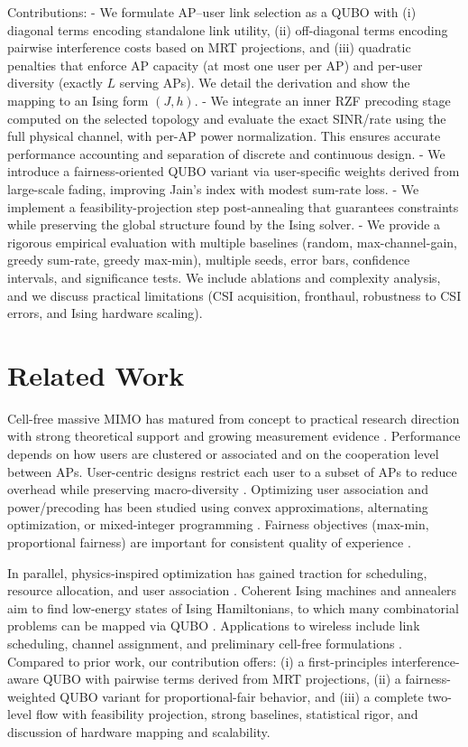 {Contributions:
- We formulate AP–user link selection as a QUBO with (i) diagonal terms encoding standalone link utility, (ii) off-diagonal terms encoding pairwise interference costs based on MRT projections, and (iii) quadratic penalties that enforce AP capacity (at most one user per AP) and per-user diversity (exactly $L$ serving APs). We detail the derivation and show the mapping to an Ising form $(J,h)$.
- We integrate an inner RZF precoding stage computed on the selected topology and evaluate the exact SINR/rate using the full physical channel, with per-AP power normalization. This ensures accurate performance accounting and separation of discrete and continuous design.
- We introduce a fairness-oriented QUBO variant via user-specific weights derived from large-scale fading, improving Jain’s index with modest sum-rate loss. 
- We implement a feasibility-projection step post-annealing that guarantees constraints while preserving the global structure found by the Ising solver.
- We provide a rigorous empirical evaluation with multiple baselines (random, max-channel-gain, greedy sum-rate, greedy max-min), multiple seeds, error bars, confidence intervals, and significance tests. We include ablations and complexity analysis, and we discuss practical limitations (CSI acquisition, fronthaul, robustness to CSI errors, and Ising hardware scaling).

\section{Related Work}
Cell-free massive MIMO has matured from concept to practical research direction with strong theoretical support and growing measurement evidence \cite{ngo2017cell,demir2021foundations,bjornson2019massive}. Performance depends on how users are clustered or associated and on the cooperation level between APs. User-centric designs restrict each user to a subset of APs to reduce overhead while preserving macro-diversity \cite{buzzi2019user,chen2020structured}. Optimizing user association and power/precoding has been studied using convex approximations, alternating optimization, or mixed-integer programming \cite{nayebi2017precoding,bjornson2019making}. Fairness objectives (max-min, proportional fairness) are important for consistent quality of experience \cite{bashar2021max}.


In parallel, physics-inspired optimization has gained traction for scheduling, resource allocation, and user association \cite{kasi2021resource,grassl2022ising}. Coherent Ising machines and annealers aim to find low-energy states of Ising Hamiltonians, to which many combinatorial problems can be mapped via QUBO \cite{lucas2014ising,mcmahon2016fully,inagaki2016coherent,glover2018tutorial}. Applications to wireless include link scheduling, channel assignment, and preliminary cell-free formulations \cite{zhao2022joint}. Compared to prior work, our contribution offers: (i) a first-principles interference-aware QUBO with pairwise terms derived from MRT projections, (ii) a fairness-weighted QUBO variant for proportional-fair behavior, and (iii) a complete two-level flow with feasibility projection, strong baselines, statistical rigor, and discussion of hardware mapping and scalability.

}
